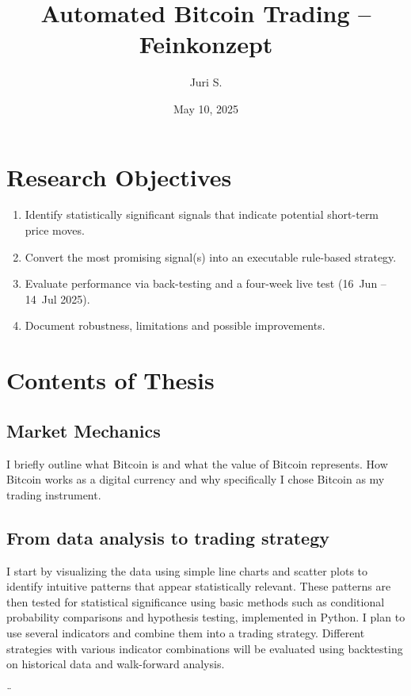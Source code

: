 \documentclass[12pt,a4paper]{article}
\title{Automated Bitcoin Trading – Feinkonzept}
\author{Juri S.}
\date{May 10, 2025}
\begin{document}
\maketitle
\tableofcontents
\newpage

\section{Research Objectives}
\begin{enumerate}
  \item Identify statistically significant signals that indicate potential short-term price moves.
  \item Convert the most promising signal(s) into an executable rule-based strategy.
  \item Evaluate performance via back-testing and a four-week live test (16~Jun – 14~Jul 2025).
  \item Document robustness, limitations and possible improvements.
\end{enumerate}

\section{Contents of Thesis}
\subsection{Market Mechanics}
I briefly outline what Bitcoin is and what the value of Bitcoin represents. How Bitcoin works as a digital currency and why specifically I chose Bitcoin as my trading instrument.


\subsection{From data analysis to trading strategy}
I start by visualizing the data using simple line charts and scatter plots to identify intuitive patterns that appear statistically relevant.
These patterns are then tested for statistical significance using basic methods such as conditional probability comparisons and hypothesis testing, implemented in Python.
I plan to use several indicators and combine them into a trading strategy. 
Different strategies with various indicator combinations will be evaluated using backtesting on historical data and walk-forward analysis.



¨%
\end{document}

